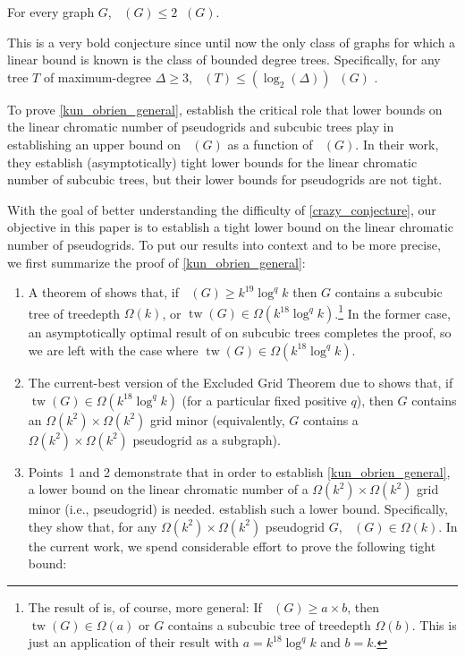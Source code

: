 \documentclass{patmorin}
\DeclareMathOperator{\tw}{tw}
\DeclareMathOperator{\chicen}{\chi_{\mathrm{cen}}}
\DeclareMathOperator{\chilin}{\chi_{\mathrm{lin}}}
\begin{document}
\begin{conj}\label{crazy_conjecture}
  For every graph $G$, $\chicen(G)\le 2\chilin(G)$.
\end{conj}

This is a very bold conjecture since until now the only class of graphs for which a linear bound is known is the class of bounded degree trees. Specifically, for any tree $T$ of maximum-degree $\Delta\ge 3$, $\chicen(T) \le (\log_2(\Delta))\chilin(G)$ \cite[Theorem~4]{kun.obrien.ea:polynomial}.

To prove \cref{kun_obrien_general}, \citet{kun.obrien.ea:polynomial} establish the critical role that lower bounds on the linear chromatic number of pseudogrids and subcubic trees play in establishing an upper bound on $\chicen(G)$ as a function of $\chilin(G)$. In their work, they establish (asymptotically) tight lower bounds for the linear chromatic number of subcubic trees, but their lower bounds for pseudogrids are not tight.

With the goal of better understanding the difficulty of \cref{crazy_conjecture}, our objective in this paper is to establish a tight lower bound on the linear chromatic number of pseudogrids. To put our results into context and to be more precise, we first summarize the proof of \cref{kun_obrien_general}:

\begin{enumerate}
  \item A theorem of \citet{czerwinski.nadara.ea:improved} shows that, if $\chicen(G)\ge k^{19}\log^{q} k$ then $G$ contains a subcubic tree of treedepth $\Omega(k)$, or $\tw(G)\in\Omega(k^{18}\log^q k)$.\footnote{The result of \citet{czerwinski.nadara.ea:improved} is, of course, more general:  If $\chicen(G)\ge a\times b$, then $\tw(G)\in\Omega(a)$ or $G$ contains a subcubic tree of treedepth $\Omega(b)$. This is just an application of their result with $a=k^{18}\log^q k$ and $b=k$.}  In the former case, an asymptotically optimal result of \citet{kun.obrien.ea:polynomial} on subcubic trees completes the proof, so we are left with the case where $\tw(G)\in\Omega(k^{18}\log^q k)$.

  \item The current-best version of the Excluded Grid Theorem due to \citet{chuzhoy.tan:towards} shows that, if $\tw(G)\in\Omega(k^{18}\log^q k)$ (for a particular fixed positive $q$), then $G$ contains an $\Omega(k^2)\times \Omega(k^2)$ grid minor (equivalently, $G$ contains a $\Omega(k^2)\times\Omega(k^2)$ pseudogrid as a subgraph).

  \item Points~1 and 2 demonstrate that in order to establish \cref{kun_obrien_general}, a lower bound on the linear chromatic number of a $\Omega(k^2)\times\Omega(k^2)$ grid minor (i.e., pseudogrid) is needed.  \citet[Lemma~5]{kun.obrien.ea:polynomial} establish such a lower bound. Specifically, they show that, for any $\Omega(k^2)\times \Omega(k^2)$ pseudogrid $G$, $\chilin(G)\in\Omega(k)$.
  In the current work, we spend considerable effort to prove the following tight bound:
\end{enumerate}
\end{document}
